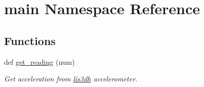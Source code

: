\hypertarget{namespacemain}{}\section{main Namespace Reference}
\label{namespacemain}
\subsection*{Functions}
\begin{DoxyCompactItemize}
\item 
def \mbox{\hyperlink{namespacemain_a8c1b4e8df74031b6ee2d0809895a7c87}{get\+\_\+reading}} (num)
\begin{DoxyCompactList}\small\item\em Get acceleration from \mbox{\hyperlink{namespacelis3dh}{lis3dh}} accelerometer. \end{DoxyCompactList}\end{DoxyCompactItemize}
